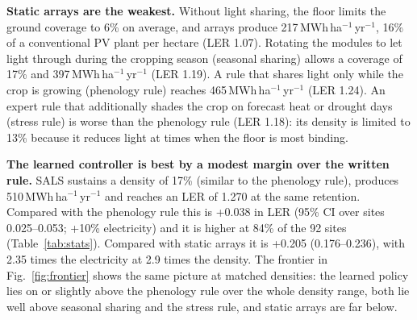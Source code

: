 \textbf{Static arrays are the weakest.} Without light sharing, the floor limits the ground coverage to 6\% on average, and arrays produce 217\,MWh\,ha$^{-1}$\,yr$^{-1}$, 16\% of a conventional PV plant per hectare (LER 1.07). Rotating the modules to let light through during the cropping season (seasonal sharing) allows a coverage of 17\% and 397\,MWh\,ha$^{-1}$\,yr$^{-1}$ (LER 1.19). A rule that shares light only while the crop is growing (phenology rule) reaches 465\,MWh\,ha$^{-1}$\,yr$^{-1}$ (LER 1.24). An expert rule that additionally shades the crop on forecast heat or drought days (stress rule) is worse than the phenology rule (LER 1.18): its density is limited to 13\% because it reduces light at times when the floor is most binding.

\textbf{The learned controller is best by a modest margin over the written rule.} SALS sustains a density of 17\% (similar to the phenology rule), produces 510\,MWh\,ha$^{-1}$\,yr$^{-1}$ and reaches an LER of 1.270 at the same retention. Compared with the phenology rule this is +0.038 in LER (95\% CI over sites 0.025--0.053; +10\% electricity) and it is higher at 84\% of the 92 sites (Table~\ref{tab:stats}). Compared with static arrays it is +0.205 (0.176--0.236), with 2.35 times the electricity at 2.9 times the density. The frontier in Fig.~\ref{fig:frontier} shows the same picture at matched densities: the learned policy lies on or slightly above the phenology rule over the whole density range, both lie well above seasonal sharing and the stress rule, and static arrays are far below.

